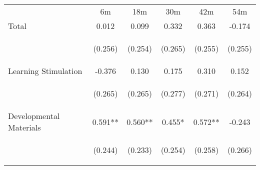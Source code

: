\begin{tabular}{lccccc}
\hline \noalign{\smallskip} & 6m & 18m & 30m & 42m & 54m\\
\noalign{\smallskip}\hline \noalign{\smallskip}Total & 0.012 & 0.099 & 0.332 & 0.363 & -0.174\\
 & \begin{footnotesize}(0.256)\end{footnotesize} & \begin{footnotesize}(0.254)\end{footnotesize} & \begin{footnotesize}(0.265)\end{footnotesize} & \begin{footnotesize}(0.255)\end{footnotesize} & \begin{footnotesize}(0.255)\end{footnotesize}\\
\noalign{\smallskip}Learning Stimulation & -0.376 & 0.130 & 0.175 & 0.310 & 0.152\\
 & \begin{footnotesize}(0.265)\end{footnotesize} & \begin{footnotesize}(0.265)\end{footnotesize} & \begin{footnotesize}(0.277)\end{footnotesize} & \begin{footnotesize}(0.271)\end{footnotesize} & \begin{footnotesize}(0.264)\end{footnotesize}\\
\noalign{\smallskip}Developmental Materials & 0.591** & 0.560** & 0.455* & 0.572** & -0.243\\
 & \begin{footnotesize}(0.244)\end{footnotesize} & \begin{footnotesize}(0.233)\end{footnotesize} & \begin{footnotesize}(0.254)\end{footnotesize} & \begin{footnotesize}(0.258)\end{footnotesize} & \begin{footnotesize}(0.266)\end{footnotesize}\\

\end{tabular}
